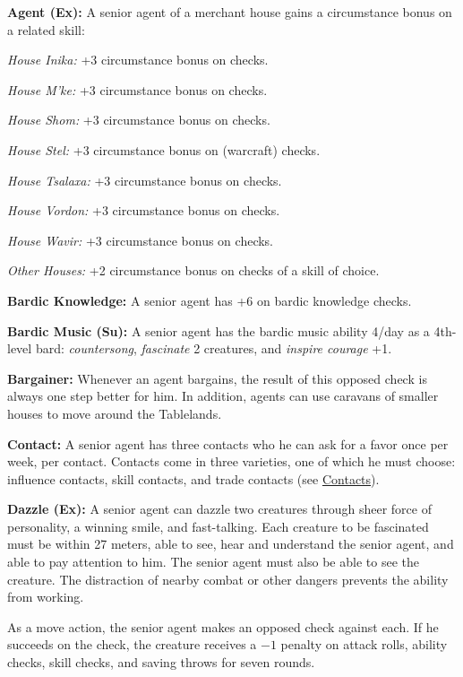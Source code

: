 \textbf{Agent (Ex):} A senior agent of a merchant house gains a circumstance bonus on a related skill:

\textit{House Inika:} +3 circumstance bonus on  checks.

\textit{House M'ke:} +3 circumstance bonus on  checks.

\textit{House Shom:} +3 circumstance bonus on  checks.

\textit{House Stel:} +3 circumstance bonus on  (warcraft) checks.

\textit{House Tsalaxa:} +3 circumstance bonus on  checks.

\textit{House Vordon:} +3 circumstance bonus on  checks.

\textit{House Wavir:} +3 circumstance bonus on  checks.

\textit{Other Houses:} +2 circumstance bonus on checks of a skill of choice.

\textbf{Bardic Knowledge:} A senior agent has +6 on bardic knowledge checks.

\textbf{Bardic Music (Su):} A senior agent has the bardic music ability 4/day as a 4th-level bard: \emph{countersong}, \emph{fascinate} 2 creatures, and \emph{inspire courage} +1.

\textbf{Bargainer:} Whenever an agent bargains, the result of this  opposed check is always one step better for him. In addition, agents can use caravans of smaller houses to move around the Tablelands.

\textbf{Contact:} A senior agent has three contacts who he can ask for a favor once per week, per contact. Contacts come in three varieties, one of which he must choose: influence contacts, skill contacts, and trade contacts (see \hyperref[sec:contacts]{Contacts}).

\textbf{Dazzle (Ex):} A senior agent can dazzle two creatures through sheer force of personality, a winning smile, and fast-talking. Each creature to be fascinated must be within 27 meters, able to see, hear and understand the senior agent, and able to pay attention to him. The senior agent must also be able to see the creature. The distraction of nearby combat or other dangers prevents the ability from working.

As a move action, the senior agent makes an opposed  check against each. If he succeeds on the check, the creature receives a $-1$ penalty on attack rolls, ability checks, skill checks, and saving throws for seven rounds.

